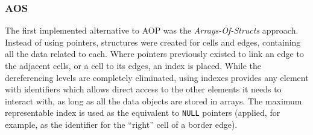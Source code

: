 \subsubsection{AOS}
\label{sec:321}


The first implemented alternative to AOP was the \textit{Arrays-Of-Structs} approach.
Instead of using pointers, structures were created for cells and edges, containing all the data related to each.
Where pointers previously existed to link an edge to the adjacent cells, or a cell to its edges, an index is placed.
While the dereferencing levels are completely eliminated, using indexes provides any element with identifiers which allows direct access to the other elements it needs to interact with, as long as all the data objects are stored in arrays.
The maximum representable index is used as the equivalent to \texttt{NULL} pointers (applied, for example, as the identifier for the ``right'' cell of a border edge).